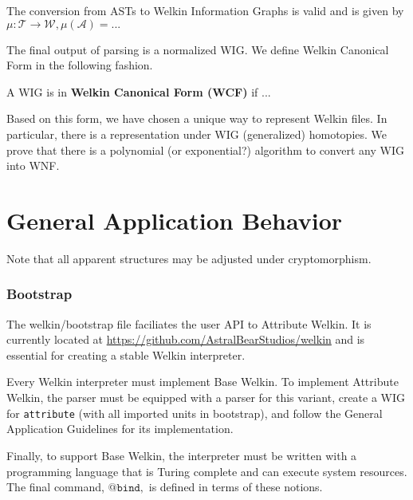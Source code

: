 \begin{lemma}
  The conversion from ASTs to Welkin Information Graphs is valid and is given by $\mu: \mathcal{T} \to \mathcal{W}, \mu(\mathcal{A}) = ...$
\end{lemma}

The final output of parsing is a normalized WIG. We define Welkin Canonical Form in the following fashion.
\begin{definition}
A WIG is in \textbf{Welkin Canonical Form (WCF)} if ...
\end{definition}
Based on this form, we have chosen a unique way to represent Welkin files. In particular, there is a representation under WIG (generalized) homotopies. We prove that there is a polynomial (or exponential?) algorithm to convert any WIG into WNF.




\section{General Application Behavior}

Note that all apparent structures may be adjusted under cryptomorphism.

\subsubsection{Bootstrap}
The welkin/bootstrap file faciliates the user API to Attribute Welkin. It is currently located at \url{https://github.com/AstralBearStudios/welkin} and is essential for creating a stable Welkin interpreter.

Every Welkin interpreter must implement Base Welkin. To implement Attribute Welkin, the parser must be equipped with a parser for this variant, create a WIG for \texttt{attribute} (with all imported units in bootstrap), and follow the General Application Guidelines for its implementation.

Finally, to support Base Welkin, the interpreter must be written with a programming language that is Turing complete and can execute system resources. The final command, $\texttt{@bind},$ is defined in terms of these notions. %



